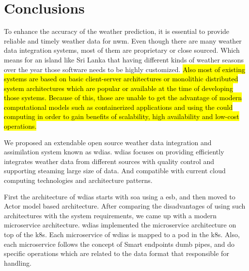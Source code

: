 \section{Conclusions}
\label{se:summary_conclusion}

To enhance the accuracy of the weather prediction, it is essential to provide reliable and timely weather data for \acrshort{nwm}. Even though there are many weather data integration systems, most of them are proprietary or close sourced. Which means for an island like Sri Lanka that having different kinds of weather seasons over the year those software needs to be highly customized. %
\hl{Also most of existing systems are based on basic client-server architectures or monolithic distributed system architectures which are popular or available at the time of developing those systems. Because of this, those are unable to get the advantage of modern computational models such as containerized applications and using the could computing in order to gain benefits of scalability, high availability and low-cost operations.}


We proposed an extendable open source weather data integration and assimilation system known as \acrshort{wdias}. \acrshort{wdias} focuses on providing efficiently integrates weather data from different sources with quality control and supporting steaming large size of data. And compatible with current cloud computing technologies and architecture patterns.

First the architecture of \acrshort{wdias} starts with \acrshort{soa} using a \acrfull{esb}, and then moved to Actor model based architecture. After comparing the disadvantages of using such architectures with the system requirements, we came up with a modern microservice architecture.
\acrshort{wdias} implemented the microservice architecture on top of the \acrshort{k8s}. Each microservice of \acrshort{wdias} is mapped to a pod in the \acrshort{k8s}. Also, each microservice follows the concept of Smart endpoints dumb pipes, and do specific operations which are related to the data format that responsible for handling.

